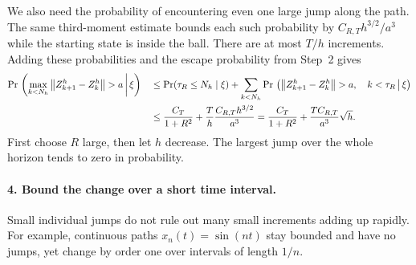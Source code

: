 We also need the probability of encountering even one large jump along the path. The same third-moment estimate bounds each such probability by $C_{R,T}h^{3/2}/a^3$ while the starting state is inside the ball. There are at most $T/h$ increments. Adding these probabilities and the escape probability from Step~2 gives
\begin{align}\label{eq:maximum-jump}
 \Pr\,\left(\max_{k<N_h}\left\lVert Z_{k+1}^h-Z_k^h\right\rVert>a\,\middle|\,\xi\right)
 &\quad\leq\Pr(\tau_R\leq N_h\mid\xi)
 +\sum_{k<N_h}\Pr\,\left(\left\lVert Z_{k+1}^h-Z_k^h\right\rVert>a,\quad k<\tau_R\,\middle|\,\xi\right)\notag\\
 &\quad\leq\frac{C_T}{1+R^2}+\frac{T}{h}\frac{C_{R,T}h^{3/2}}{a^3}
 =\frac{C_T}{1+R^2}+\frac{T C_{R,T}}{a^3}\sqrt h .
\end{align}
First choose $R$ large, then let $h$ decrease. The largest jump over the whole horizon tends to zero in probability.

\paragraph{4. Bound the change over a short time interval.}
Small individual jumps do not rule out many small increments adding up rapidly. For example, continuous paths $x_n(t)=\sin(nt)$ stay bounded and have no jumps, yet change by order one over intervals of length $1/n$. 

